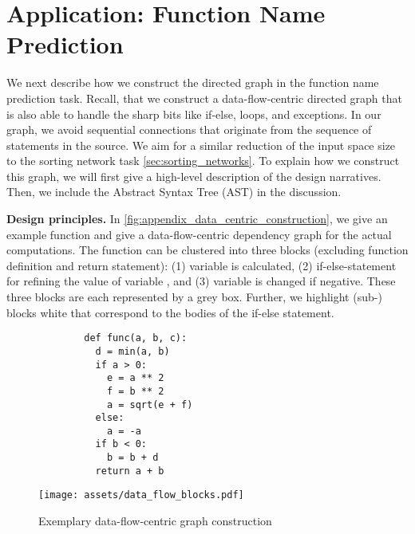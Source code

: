 \documentclass{article}
\begin{document}
\section{Application: Function Name Prediction}\label{sec:appendix_source_code}

We next describe how we construct the directed graph in the function name prediction task. Recall, that we construct a data-flow-centric directed graph that is also able to handle the sharp bits like if-else, loops, and exceptions. In our graph, we avoid sequential connections that originate from the sequence of statements in the source. We aim for a similar reduction of the input space size to the sorting network task \autoref{sec:sorting_networks}. To explain how we construct this graph, we will first give a high-level description of the design narratives. Then, we include the Abstract Syntax Tree (AST) in the discussion.

\textbf{Design principles.} In \autoref{fig:appendix_data_centric_construction}, we give an example function and give a data-flow-centric dependency graph for the actual computations. The function can be clustered into three blocks (excluding function definition and return statement): (1) variable  is calculated, (2) if-else-statement for refining the value of variable , and (3) variable  is changed if negative. These three blocks are each represented by a grey box. Further, we highlight (sub-) blocks white that correspond to the bodies of the if-else statement.

\begin{figure}[H]
    \hspace{-15pt}
    \begin{minipage}{0.325\textwidth}
        \begin{verbatim}
        def func(a, b, c):
          d = min(a, b)
          if a > 0:
            e = a ** 2
            f = b ** 2
            a = sqrt(e + f)
          else:
            a = -a
          if b < 0:
            b = b + d
          return a + b
        \end{verbatim}
    \end{minipage}
    \hspace{25pt}
    \begin{minipage}{0.6\textwidth}
        \texttt{[image: assets/data\_flow\_blocks.pdf]}
    \end{minipage}
    \hfill{}
    \caption{Exemplary data-flow-centric graph construction\label{fig:appendix_data_centric_construction}}
\end{figure}
\end{document}

